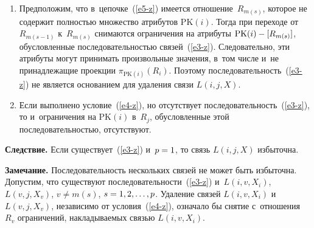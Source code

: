\begin{multicols}{2}
\begin{enumerate}[1.]
Данная последовательность включений гарантирует, что
в~$R_j$ не появится кортежа со зна-\linebreak чением $PK(i)$, не содержащимся в~других\linebreak
отношениях цепочки~(\ref{e5-z}). Это служит более\linebreak \mbox{сильным} ограничением,
чем задает связь $L(i,j,X)$ и,~следовательно, она избыточна 
в~соответствии с~определением~6. Пусть связь $L(m(p),j,X_p)$
в~по\-сле\-до\-ва\-тель\-ности~(\ref{e3-z}) является расширенной, а~связь $L(i,j,X)$ не
является расширенной. Другие связи в~последовательности~(\ref{e3-z}) не
могут быть расширенными, так как общие атрибуты во вторых отношениях
должны быть ключевыми. В~отношении~$R_j$ не появится кортеж с~пустыми
значениями всех атрибутов $\mathrm{PK}(i)$, поскольку данное ограничение
уста\-нав\-ливается внутри~$R_j$. Поэтому связь $L(i,j,X)$ может быть удалена.

\pagebreak

  \item Предположим, что в~цепочке~(\ref{e5-z}) имеется
отношение~$R_{m(s)}$, которое не содержит полностью множество атрибутов
$\mathrm{PK}(i)$. Тогда при переходе от~$R_{m(s-1)}$ к~$R_{m(s)}$ снимаются
ограничения на атрибуты $\mathrm{PK}(i)\hm- [R_{m(s)}]$, обусловленные
последовательностью связей~(\ref{e3-z}). Следовательно, эти атрибуты могут
принимать произвольные значения, в~том числе и~не принадлежащие проекции
$\pi_{\mathrm{PK}(i)}(R_i)$. Поэтому последовательность~(\ref{e3-z}) не является
основанием для удаления связи $L(i,j,X)$.
  \item Если выполнено условие~(\ref{e4-z}), но отсутствует
последовательность~(\ref{e3-z}), то и~ограничения на $\mathrm{PK}(i)$ в~$R_j$,
обусловленные этой последовательностью, отсутствуют.
  \end{enumerate}


  \noindent
  \textbf{Следствие.} Если существует~(\ref{e3-z}) и~$p\hm=1$, то связь
$L(i,j,X)$ избыточна.

  \smallskip

  \noindent
  \textbf{Замечание.} Последовательность нескольких связей не может быть
избыточна. Допустим, что существуют последовательности~(\ref{e3-z})
и~$L(i,v,X_i)$, $L(v,j,X_v)$, $v\not= m(s)$, $s\hm= 1,2, \ldots, p$. Удаление
связей $L(i,v,X_i)$ и~$L(v,j,X_v)$, независимо от условия~(\ref{e4-z}),
означало бы снятие с~отношения~$R_v$ ограничений, накладываемых связью
$L(i,v,X_i)$.



\end{multicols}
